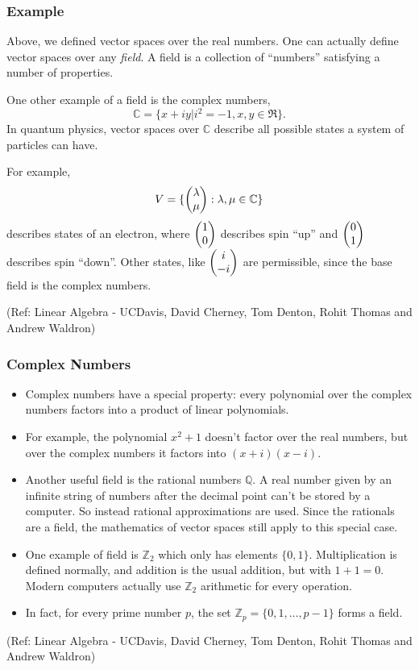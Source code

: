 \begin{frame}[fragile]
\frametitle{Example}
\begin{remark}  Above, we defined vector spaces over the real numbers.  One can actually define vector spaces over any \emph{field}.  A field is a collection of ``numbers'' satisfying a number of properties.

\end{remark}

One other example of a field is the complex numbers, 
\[
\mathbb{C}= \{x+iy | i^2=-1, x,y\in \Re \}.
\]
In quantum physics, vector spaces over $\mathbb{C}$ describe all possible states a system of particles can have.  

For example,
\[
V= \{ \begin{pmatrix}\lambda \\ \mu\end{pmatrix} : \lambda, \mu \in \mathbb{C}\}
\]
describes states of an electron, where $\begin{pmatrix}1 \\ 0\end{pmatrix}$ describes spin ``up'' and $\begin{pmatrix}0 \\ 1\end{pmatrix}$ describes spin ``down''.  Other states, like $\begin{pmatrix}i \\ -i\end{pmatrix}$ are permissible, since the base field is the complex numbers.

\tiny{(Ref: Linear Algebra - UCDavis, David Cherney, Tom Denton, Rohit Thomas and Andrew Waldron)}
\end{frame}

\begin{frame}[fragile]
\frametitle{Complex Numbers}
\begin{itemize}
\item Complex numbers have a special property: every polynomial over the complex numbers factors into a product of linear polynomials.  
\item For example, the polynomial $x^2+1$ doesn't factor over the real numbers, but over the complex numbers it factors into $(x+i)(x-i)$. 

\item Another useful field is the rational numbers $\mathbb{Q}$.  A real number given by an infinite string of numbers after the decimal point can't be stored by a computer.  So instead rational approximations are used.  Since the rationals are a field, the mathematics of vector spaces still apply to this special case.

\item One example of field is $\mathbb{Z}_2$ which only has elements $\{0,1\}$.  Multiplication is defined normally, and addition is the usual addition, but with $1+1=0$. Modern computers actually use $\mathbb{Z}_2$ arithmetic for every operation.  

\item In fact, for every prime number $p$, the set $\mathbb{Z}_p=\{0,1,\ldots, p-1\} $ forms a field.  
\end{itemize}

\tiny{(Ref: Linear Algebra - UCDavis, David Cherney, Tom Denton, Rohit Thomas and Andrew Waldron)}
\end{frame}


